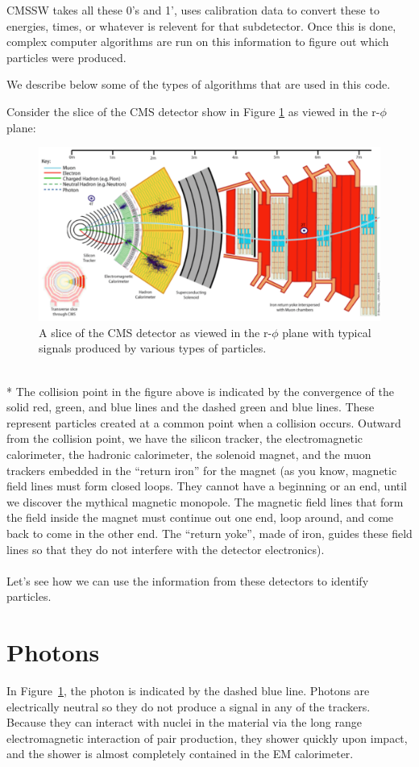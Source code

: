 CMSSW takes all these 0's and 1', uses calibration data to convert these to energies, times, or whatever is relevent for that subdetector.  Once this is done,   complex computer algorithms are run on this information to figure out which particles were produced.  

We describe below some of the types of algorithms that are used in this code.


Consider the slice of the CMS detector show in Figure \ref{fig:pid1} as viewed in the r-$\phi$ plane: 
\begin{figure}[h]
\centering\includegraphics[scale=0.6]{./particleID/Pictures/fig1.pdf}
\caption{A slice of the CMS detector as viewed in the r-$\phi$ plane with typical signals produced by various types of particles. }
\label{fig:pid1}
\end{figure} 
\\*
The collision point in the figure above is indicated by the convergence of the solid red, green, and blue lines and the dashed green and blue lines.  These represent particles created at a common point when a collision occurs.  Outward from the collision point, we have the silicon tracker, the electromagnetic calorimeter, the hadronic calorimeter, the solenoid magnet, and the muon trackers embedded in the ``return iron'' for the magnet (as you know, magnetic field lines must form closed loops. They cannot have a beginning or an end, until we discover the mythical magnetic monopole. The magnetic field lines that form the field inside the magnet must continue out one end, loop around, and come back to come in the other end. The ``return yoke'', made of iron, guides these field lines so that they do not interfere with the detector electronics).  
\\
\\
\noindent
Let's see how we can use the information from these detectors to identify particles.
\section{Photons}
In Figure~\ref{fig:pid1}, the photon is indicated by the dashed blue line.  Photons are electrically neutral so they do not produce a signal in any of the trackers.  Because they can interact with nuclei in the material via the long range electromagnetic interaction of pair production, they shower quickly upon impact, and the shower is almost completely contained in the EM calorimeter.
